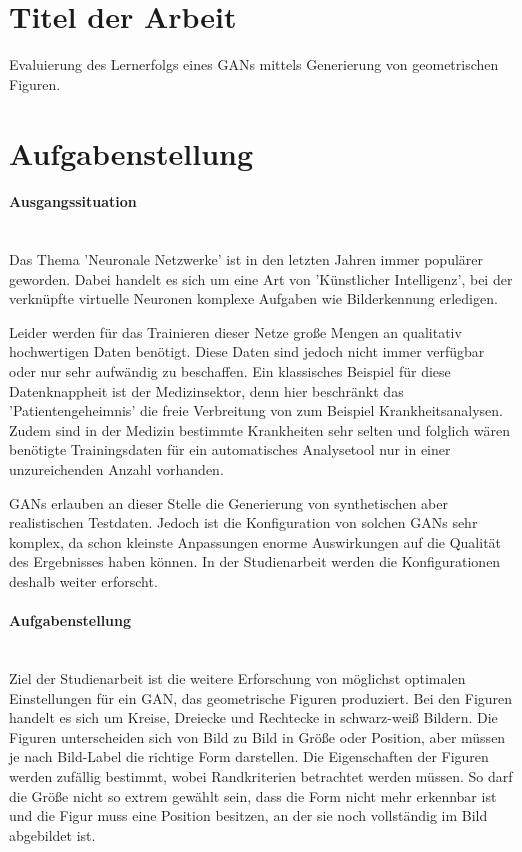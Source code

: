 
\newcommand{\Titel}{Aufgabenstellung}


\section{Titel der Arbeit}
Evaluierung des Lernerfolgs eines GANs mittels Generierung von geometrischen Figuren.

\section{Aufgabenstellung}
\paragraph{Ausgangssituation} \hfill \\
Das Thema 'Neuronale Netzwerke' ist in den letzten Jahren immer populärer geworden.
Dabei handelt es sich um eine Art von 'Künstlicher Intelligenz', bei der verknüpfte virtuelle Neuronen komplexe Aufgaben wie Bilderkennung erledigen.

Leider werden für das Trainieren dieser Netze große Mengen an qualitativ hochwertigen Daten benötigt.
Diese Daten sind jedoch nicht immer verfügbar oder nur sehr aufwändig zu beschaffen.
Ein klassisches Beispiel für diese Datenknappheit ist der Medizinsektor, denn hier beschränkt das 'Patientengeheimnis' die freie Verbreitung von zum Beispiel Krankheitsanalysen.
Zudem sind in der Medizin bestimmte Krankheiten sehr selten und folglich wären benötigte Trainingsdaten für ein automatisches Analysetool nur in einer unzureichenden Anzahl vorhanden.

GANs erlauben an dieser Stelle die Generierung von synthetischen aber realistischen Testdaten.
Jedoch ist die Konfiguration von solchen GANs sehr komplex, da schon kleinste Anpassungen enorme Auswirkungen auf die Qualität des Ergebnisses haben können.
In der Studienarbeit werden die Konfigurationen deshalb weiter erforscht.

\paragraph{Aufgabenstellung} \hfill \\
Ziel der Studienarbeit ist die weitere Erforschung von möglichst optimalen Einstellungen für ein GAN, das geometrische Figuren produziert.
Bei den Figuren handelt es sich um Kreise, Dreiecke und Rechtecke in schwarz-weiß Bildern.
Die Figuren unterscheiden sich von Bild zu Bild in Größe oder Position, aber müssen je nach Bild-Label die richtige Form darstellen.
Die Eigenschaften der Figuren werden zufällig bestimmt, wobei Randkriterien betrachtet werden müssen.
So darf die Größe nicht so extrem gewählt sein, dass die Form nicht mehr erkennbar ist und die Figur muss eine Position besitzen, an der sie noch vollständig im Bild abgebildet ist.

